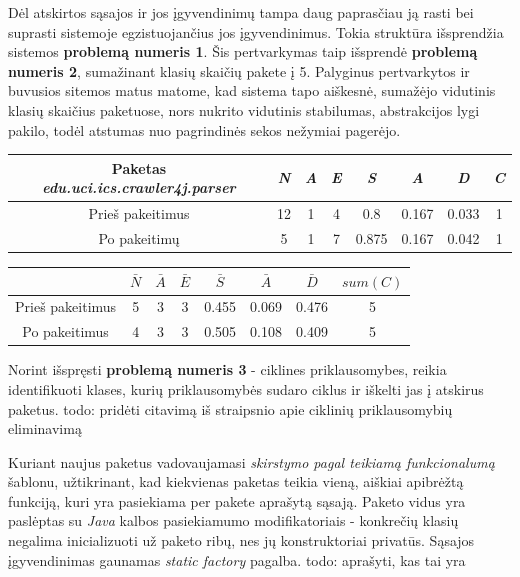 Dėl atskirtos sąsajos ir jos įgyvendinimų tampa daug paprasčiau ją rasti bei suprasti sistemoje egzistuojančius jos įgyvendinimus.
Tokia struktūra išsprendžia sistemos \textbf{problemą numeris 1}.
Šis pertvarkymas taip išsprendė \textbf{problemą numeris 2}, sumažinant klasių skaičių pakete į 5.
Palyginus pertvarkytos ir buvusios sitemos matus matome, kad sistema tapo aiškesnė, sumažėjo vidutinis klasių skaičius paketuose, nors nukrito
vidutinis stabilumas, abstrakcijos lygi pakilo, todėl atstumas nuo pagrindinės sekos nežymiai pagerėjo.
\begin{center}
    \begin{tabular}{|c|c|c|c|c|c|c|c|}
        \hline
        Paketas \textit{edu.uci.ics.crawler4j.parser} & \textit{N} & \textit{A} & \textit{E} & \textit{S} & \textit{A} & \textit{D} & \textit{C} \\ [0.5ex]
        \hline\hline
        Prieš pakeitimus & 12 & 1 & 4 & 0.8 & 0.167 & 0.033 & 1 \\
        \hline
        Po pakeitimų & 5 & 1 & 7 & 0.875 & 0.167 & 0.042 & 1 \\
        \hline
    \end{tabular}
    \begin{tabular}{|c|c|c|c|c|c|c|c|}
        \hline
        & $\bar{N}$ & $\bar{A}$ & $\bar{E}$ & $\bar{S}$ & $\bar{A}$ & $\bar{D}$ & $sum(C)$\\ [0.5ex]
        \hline\hline
        Prieš pakeitimus & 5 & 3 & 3 & 0.455 & 0.069 & 0.476 & 5\\
        \hline
        Po pakeitimus & 4 & 3 & 3 & 0.505 & 0.108 & 0.409 & 5 \\
        \hline
    \end{tabular}
\end{center}
Norint išspręsti \textbf{problemą numeris 3} - ciklines priklausomybes, reikia identifikuoti klases, kurių priklausomybės
sudaro ciklus ir iškelti jas į atskirus paketus.
todo: pridėti citavimą iš straipsnio apie ciklinių priklausomybių eliminavimą

Kuriant naujus paketus vadovaujamasi \textit{skirstymo pagal teikiamą funkcionalumą} šablonu, užtikrinant, kad kiekvienas
paketas teikia vieną, aiškiai apibrėžtą funkciją, kuri yra pasiekiama per pakete aprašytą sąsają.
Paketo vidus yra paslėptas su \textit{Java} kalbos pasiekiamumo modifikatoriais - konkrečių klasių negalima inicializuoti už paketo ribų,
nes jų konstruktoriai privatūs.
Sąsajos įgyvendinimas gaunamas \textit{static factory} pagalba.
todo: aprašyti, kas tai yra

